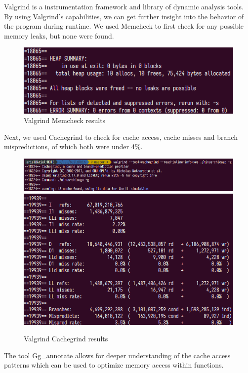 Valgrind is a instrumentation framework and library of dynamic analysis tools.
By using Valgrind's capabilities, we can get further insight into the behavior
of the program during runtime. We used Memcheck to first check for any possible
memory leaks, but none were found.
\begin{figure}[H]
  \includegraphics[width=0.8\columnwidth]{figs/valgrind_memcheck}
    \caption{Valgrind Memcheck results}
\end{figure}
Next, we used Cachegrind to check for cache access, cache misses and branch
mispredictions, of which both were under 4\%.
\begin{figure}[H]
  \includegraphics[width=0.8\columnwidth]{figs/valgrind_cachegrind}
  \includegraphics[width=0.8\columnwidth]{figs/valgrind_cachegrind_results}
\caption{Valgrind Cachegrind results}
\end{figure}
The tool Gg\_annotate allows for deeper understanding of the cache access
patterns which can be used to optimize memory access within functions.

